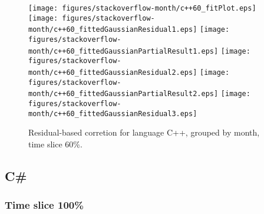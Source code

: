 \begin{figure}[t]
\centering
{}
{\texttt{[image: figures/stackoverflow-month/c++60\_fitPlot.eps]}}
{\texttt{[image: figures/stackoverflow-month/c++60\_fittedGaussianResidual1.eps]}}
{\texttt{[image: figures/stackoverflow-month/c++60\_fittedGaussianPartialResult1.eps]}}
{\texttt{[image: figures/stackoverflow-month/c++60\_fittedGaussianResidual2.eps]}}
{\texttt{[image: figures/stackoverflow-month/c++60\_fittedGaussianPartialResult2.eps]}}
{\texttt{[image: figures/stackoverflow-month/c++60\_fittedGaussianResidual3.eps]}}
\caption{Residual-based corretion for language C++, grouped by month, time slice 60\%.}
\end{figure}


\FloatBarrier


\subsection{C\#}

\subsubsection{Time slice 100\%}

